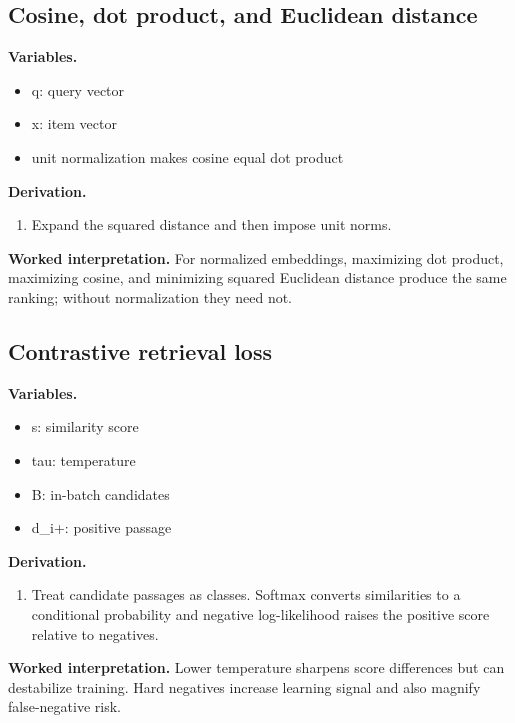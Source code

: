 \subsection{Cosine, dot product, and Euclidean distance}
\textbf{Variables.}\begin{itemize}
\item q: query vector
\item x: item vector
\item unit normalization makes cosine equal dot product
\end{itemize}
\textbf{Derivation.}\begin{derivation}\begin{enumerate}
\item Expand the squared distance and then impose unit norms.
\end{enumerate}\end{derivation}
\textbf{Worked interpretation.} For normalized embeddings, maximizing dot product, maximizing cosine, and minimizing squared Euclidean distance produce the same ranking; without normalization they need not.
\subsection{Contrastive retrieval loss}
\textbf{Variables.}\begin{itemize}
\item s: similarity score
\item tau: temperature
\item B: in-batch candidates
\item d\_i+: positive passage
\end{itemize}
\textbf{Derivation.}\begin{derivation}\begin{enumerate}
\item Treat candidate passages as classes. Softmax converts similarities to a conditional probability and negative log-likelihood raises the positive score relative to negatives.
\end{enumerate}\end{derivation}
\textbf{Worked interpretation.} Lower temperature sharpens score differences but can destabilize training. Hard negatives increase learning signal and also magnify false-negative risk.
